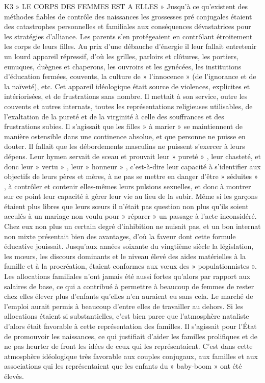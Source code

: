 K3 » LE CORPS DES FEMMES EST A ELLES » 
 Jusqu'à ce qu'existent des méthodes fiables de contrôle des naissances les grossesses pré conjugales étaient des catastrophes personnelles et familiales aux conséquences dévastatrices pour les stratégies d'alliance. Les parents s'en protégeaient en contrôlant étroitement les corps de leurs filles. Au prix d'une débauche d'énergie il leur fallait entretenir un lourd appareil répressif, d'où les grilles, parloirs et clôtures, les portiers, eunuques, duègnes et chaperons, les ouvroirs et les gynécées, les institutions d'éducation fermées, couvents, la culture de » l'innocence » (de l'ignorance et de la naïveté), etc. Cet appareil idéologique était source de violences, explicites et intériorisées, et de frustrations sans nombre. Il mettait à son service, outre les couvents et autres internats, toutes les représentations religieuses utilisables, de l'exaltation de la pureté et de la virginité à celle des souffrances et des frustrations subies. Il s'agissait que les filles » à marier » se maintiennent de manière ostensible dans une continence absolue, et que personne ne puisse en douter. Il fallait que les débordements masculins ne puissent s'exercer à leurs dépens. Leur hymen servait de sceau et prouvait leur » pureté » , leur chasteté, et donc leur » vertu » , leur » honneur » , c'est-à-dire leur capacité à s'identifier aux objectifs de leurs pères et mères, à ne pas se mettre en danger d'être » séduites » , à contrôler et contenir elles-mêmes leurs pulsions sexuelles, et donc à montrer sur ce point leur capacité à gérer leur vie au lieu de la subir. Même si les garçons étaient plus libres que leurs sœurs il n'était pas question non plus qu'ils soient acculés à un mariage non voulu pour » réparer » un passage à l'acte inconsidéré. Chez eux non plus un certain degré d'inhibition ne nuisait pas, et un bon internat non mixte présentait bien des avantages, d'où la faveur dont cette formule éducative jouissait.
 Jusqu'aux années soixante du vingtième siècle la législation, les mœurs, les discours dominants et le niveau élevé des aides matérielles à la famille et à la procréation, étaient conformes aux vœux des » populationnistes ». Les allocations familiales n'ont jamais été aussi fortes qu'alors par rapport aux salaires de base, ce qui a contribué à permettre à beaucoup de femmes de rester chez elles élever plus d'enfants qu'elles n'en auraient eu sans cela. Le marché de l'emploi aurait permis à beaucoup d'entre elles de travailler au dehors. Si les allocations étaient si substantielles, c'est bien parce que l'atmosphère nataliste d'alors était favorable à cette représentation des familles. Il s'agissait pour l'État de promouvoir les naissances, ce qui justifiait d'aider les familles prolifiques et de ne pas heurter de front les idées de ceux qui les représentaient. C'est dans cette atmosphère idéologique très favorable aux couples conjugaux, aux familles et aux associations qui les représentaient que les enfants du » baby-boom » ont été élevés. 
